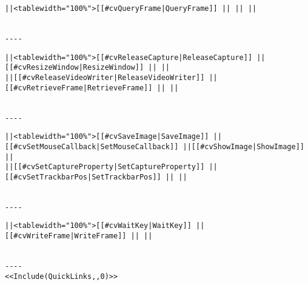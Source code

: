 \begin{verbatim}
||<tablewidth="100%">[[#cvQueryFrame|QueryFrame]] || || ||


----

\end{verbatim}
\begin{verbatim}
||<tablewidth="100%">[[#cvReleaseCapture|ReleaseCapture]] ||[[#cvResizeWindow|ResizeWindow]] || ||
||[[#cvReleaseVideoWriter|ReleaseVideoWriter]] ||[[#cvRetrieveFrame|RetrieveFrame]] || ||


----

\end{verbatim}
\begin{verbatim}
||<tablewidth="100%">[[#cvSaveImage|SaveImage]] ||[[#cvSetMouseCallback|SetMouseCallback]] ||[[#cvShowImage|ShowImage]] ||
||[[#cvSetCaptureProperty|SetCaptureProperty]] ||[[#cvSetTrackbarPos|SetTrackbarPos]] || ||


----

\end{verbatim}
\begin{verbatim}
||<tablewidth="100%">[[#cvWaitKey|WaitKey]] ||[[#cvWriteFrame|WriteFrame]] || ||


----
<<Include(QuickLinks,,0)>>
\end{verbatim}
